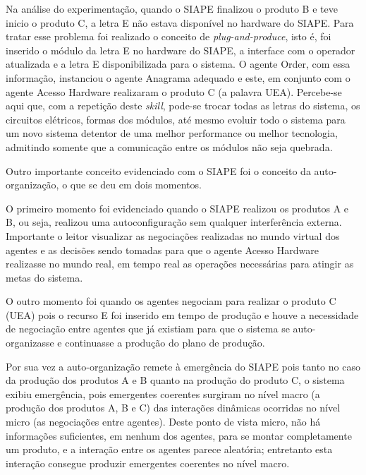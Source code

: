 	Na análise do experimentação, quando o SIAPE finalizou o produto B e teve inicio o produto C, a letra E não estava disponível no hardware do SIAPE. Para tratar esse problema foi realizado o conceito de \textit{plug-and-produce}, isto é, foi inserido  o módulo da letra E no hardware do SIAPE, a interface com o operador atualizada e a letra E disponibilizada para o sistema. O agente Order, com essa informação, instanciou o agente Anagrama adequado e este, em conjunto com o agente Acesso Hardware realizaram o produto C (a palavra UEA). Percebe-se aqui que, com a repetição deste \textit{skill}, pode-se trocar todas as letras do sistema, os circuitos elétricos, formas dos módulos, até mesmo evoluir todo o sistema para um novo sistema detentor de uma melhor performance ou melhor tecnologia, admitindo somente que a comunicação entre os módulos não seja quebrada.
	
	
	Outro importante conceito evidenciado com o SIAPE foi o conceito da auto-organização, o que se deu em dois momentos.
	
	O primeiro momento foi evidenciado quando o SIAPE realizou os produtos A e B, ou seja, realizou uma autoconfiguração sem qualquer interferência externa. Importante o leitor visualizar as negociações realizadas no mundo virtual dos agentes e as decisões sendo tomadas para que o agente Acesso Hardware realizasse no mundo real, em tempo real as operações necessárias para atingir as metas do sistema.
	
	O outro momento foi quando os agentes negociam para realizar o produto C (UEA) pois o recurso E foi inserido em tempo de produção e houve a necessidade de negociação entre agentes que já existiam para que o sistema se auto-organizasse e continuasse a produção do plano de produção.
	
	Por sua vez a auto-organização remete à emergência do SIAPE pois tanto no caso da produção dos produtos A e B quanto na produção do produto C, o sistema exibiu emergência, pois emergentes coerentes surgiram no nível macro (a produção dos produtos A, B e C)  das interações dinâmicas ocorridas no nível micro (as negociações entre agentes). Deste ponto de vista micro, não há informações suficientes, em nenhum dos agentes, para se montar completamente um produto, e a interação entre os agentes parece aleatória; entretanto esta interação consegue produzir emergentes coerentes no nível macro.
	

